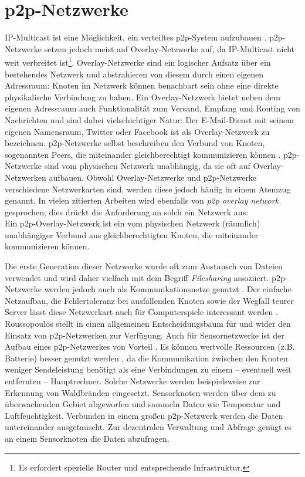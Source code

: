 \section{p2p-Netzwerke}
\label{chap:grundlagen:p2p}
IP-Multicast ist eine Möglichkeit, ein verteiltes \ac{p2p}-System aufzubauen \cite{Deering1990Multicast}. \ac{p2p}-Netzwerke setzen jedoch meist auf Overlay-Netzwerke auf, da IP-Multicast nicht weit verbreitet ist\footnote{Es erfordert spezielle Router und entsprechende Infrastruktur.}. Overlay-Netzwerke sind ein logischer Aufsatz über ein bestehendes Netzwerk und abstrahieren von diesem durch einen eigenen Adressraum: Knoten im Netzwerk können benachbart sein ohne eine direkte physikalische Verbindung zu haben. Ein Overlay-Netzwerk bietet neben dem eigenen Adressraum auch Funktionalität zum Versand, Empfang und Routing von Nachrichten \cite{Tannenbaum2003} und sind dabei vielschichtiger Natur: Der E-Mail-Dienst mit seinem eigenen Namensraum, Twitter oder Facebook ist als Overlay-Netzwerk zu bezeichnen. p2p-Netzwerke selbst beschreiben den Verbund von Knoten, sogenannten Peers, die miteinander gleichberechtigt kommunizieren können \cite{Steinmetz2005}. p2p-Netzwerke sind vom physischen Netzwerk unabhängig, da sie oft auf Overlay-Netzwerken aufbauen. Obwohl Overlay-Netzwerke und \ac{p2p}-Netzwerke verschiedene Netzwerkarten sind, werden diese jedoch häufig in einem Atemzug genannt. In vielen zitierten Arbeiten wird ebenfalls von \emph{p2p overlay network} gesprochen; dies drückt die Anforderung an solch ein Netzwerk aus:\\
Ein p2p-Overlay-Netzwerk ist ein vom physischen Netzwerk (räumlich) unabhängiger Verbund aus gleichberechtigten Knoten, die miteinander kommunizieren können.

Die erste Generation dieser Netzwerke wurde oft zum Austausch von Dateien verwendet und wird daher vielfach mit dem Begriff \emph{Filesharing} assoziiert. p2p-Netzwerke werden jedoch auch als Kommunikationsnetze genutzt \cite{Darlagiannis2006Peertopeer}. Der einfache Netzaufbau, die Fehlertoleranz bei ausfallenden Knoten sowie der Wegfall teurer Server lässt diese Netzwerkart auch für Computerspiele interessant werden \cite{Knutsson2004Peertopeer, Triebel2008Peertopeer}. Roussopoulos stellt in \cite{Roussopoulos20032} einen allgemeinen Entscheidungsbaum für und wider den Einsatz von p2p-Netzwerken zur Verfügung. Auch für Sensornetzwerke ist der Aufbau eines p2p-Netzwerkes von Vorteil \cite{MuneebAliandKoenLangendoen2007Case}. Es können wertvolle Ressourcen (z.B. Batterie) besser genutzt werden \cite{Sioutas2009Building}, da die Kommunikation zwischen den Knoten weniger Sendeleistung benötigt als eine Verbindungen zu einem -- eventuell weit entfernten -- Hauptrechner. Solche Netzwerke werden beispielsweise zur Erkennung von Waldbränden eingesetzt. Sensorknoten werden über dem zu überwachenden Gebiet abgeworfen und sammeln Daten wie Temperatur und Luftfeuchtigkeit. Verbunden in einem großen p2p-Netzwerk werden die Daten untereinander ausgetauscht. Zur dezentralen Verwaltung und Abfrage genügt es an einem Sensorknoten die Daten abzufragen.

